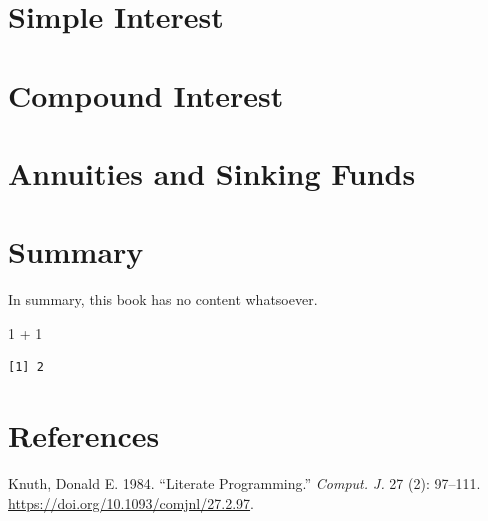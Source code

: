 \documentclass[
  letterpaper,
  DIV=11,
  numbers=noendperiod]{scrreprt}
\newenvironment{Shaded}{\begin{snugshade}}{\end{snugshade}}
\newcommand{\DecValTok}[1]{\textcolor[rgb]{0.68,0.00,0.00}{#1}}
\newcommand{\SpecialCharTok}[1]{\textcolor[rgb]{0.37,0.37,0.37}{#1}}
\newlength{\cslhangindent}
\newlength{\cslentryspacingunit} %
\newenvironment{CSLReferences}[2] %
 {%
  \setlength{\parindent}{0pt}
  \ifodd #1
  \let\oldpar\par
  \def\par{\hangindent=\cslhangindent\oldpar}
  \fi
  \setlength{\parskip}{#2\cslentryspacingunit}
 }%
 {}
\begin{document}
\hypertarget{simple-interest}{%
\chapter{Simple Interest}\label{simple-interest}}

\hypertarget{compound-interest}{%
\chapter{Compound Interest}\label{compound-interest}}

\hypertarget{annuities-and-sinking-funds}{%
\chapter{Annuities and Sinking
Funds}\label{annuities-and-sinking-funds}}


\hypertarget{summary}{%
\chapter{Summary}\label{summary}}

In summary, this book has no content whatsoever.

\begin{Shaded}
\begin{Highlighting}[]
\DecValTok{1} \SpecialCharTok{+} \DecValTok{1}
\end{Highlighting}
\end{Shaded}

\begin{verbatim}
[1] 2
\end{verbatim}


\hypertarget{references}{%
\chapter*{References}\label{references}}


\hypertarget{refs}{}
\begin{CSLReferences}{1}{0}
\leavevmode{}%
Knuth, Donald E. 1984. {``Literate Programming.''} \emph{Comput. J.} 27
(2): 97--111. \url{https://doi.org/10.1093/comjnl/27.2.97}.

\end{CSLReferences}
\end{document}
